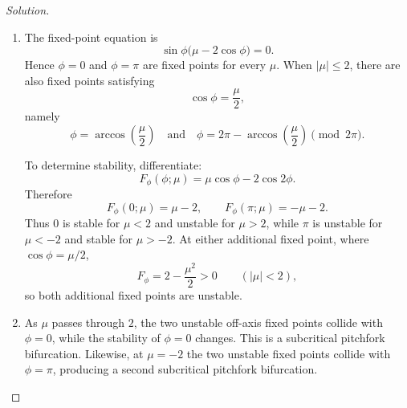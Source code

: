 \documentclass[12pt]{amsart}
\theoremstyle{conjecture}
\theoremstyle{definition}
\theoremstyle{question}
\theoremstyle{theorem}
\newenvironment{solution}
{\begin{proof}[Solution]}
{\end{proof}}
\begin{document}
\begin{enumerate}
\begin{solution}
\begin{enumerate}[label=(\alph*),leftmargin=2.6em,itemsep=0.55em]
\begin{center}
              \end{center}

              \item The fixed-point equation is
              \[
                  \sin\phi\bigl(\mu-2\cos\phi\bigr)=0.
              \]
              Hence $\phi=0$ and $\phi=\pi$ are fixed points for every $\mu$.
              When $|\mu|\leq2$, there are also fixed points satisfying
              \[
                  \cos\phi=\frac{\mu}{2},
              \]
              namely
              \[
                  \phi=\arccos\left(\frac{\mu}{2}\right)
                  \quad\text{and}\quad
                  \phi=2\pi-\arccos\left(\frac{\mu}{2}\right)
                  \pmod{2\pi}.
              \]

              To determine stability, differentiate:
              \[
                  F_\phi(\phi;\mu)=\mu\cos\phi-2\cos2\phi.
              \]
              Therefore
              \[
                  F_\phi(0;\mu)=\mu-2,
                  \qquad
                  F_\phi(\pi;\mu)=-\mu-2.
              \]
              Thus $0$ is stable for $\mu<2$ and unstable for $\mu>2$, while
              $\pi$ is unstable for $\mu<-2$ and stable for $\mu>-2$. At either
              additional fixed point, where $\cos\phi=\mu/2$,
              \[
                  F_\phi=2-\frac{\mu^2}{2}>0
                  \qquad (|\mu|<2),
              \]
              so both additional fixed points are unstable.

              \item As $\mu$ passes through $2$, the two unstable off-axis fixed
              points collide with $\phi=0$, while the stability of $\phi=0$ changes.
              This is a subcritical pitchfork bifurcation. Likewise, at $\mu=-2$
              the two unstable fixed points collide with $\phi=\pi$, producing a
              second subcritical pitchfork bifurcation.


\end{enumerate}
\end{solution}
\end{enumerate}
\end{document}
